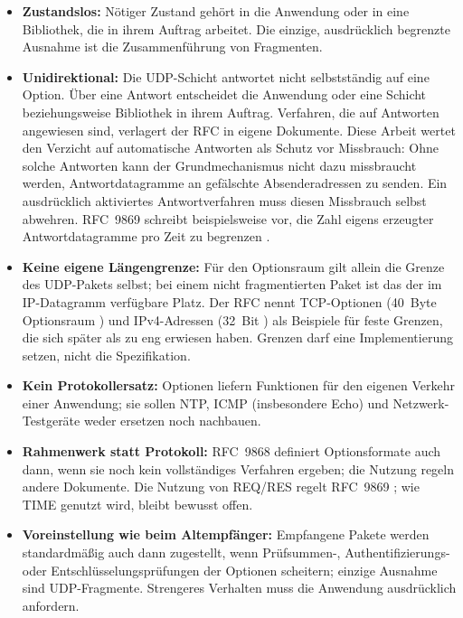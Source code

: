 \begin{itemize}
    \item \textbf{Zustandslos:} Nötiger Zustand gehört in die Anwendung oder in eine Bibliothek, die in ihrem Auftrag
    arbeitet. Die einzige, ausdrücklich begrenzte Ausnahme ist die Zusammenführung von Fragmenten.

    \item \textbf{Unidirektional:} Die UDP-Schicht antwortet nicht selbstständig auf eine Option.
    Über eine Antwort entscheidet die Anwendung oder eine Schicht beziehungsweise Bibliothek in ihrem Auftrag.
    Verfahren, die auf Antworten angewiesen sind, verlagert der RFC in eigene Dokumente. Diese Arbeit wertet den
    Verzicht auf automatische Antworten als Schutz vor Missbrauch: Ohne solche Antworten kann der Grundmechanismus nicht
    dazu missbraucht werden, Antwortdatagramme an gefälschte Absenderadressen zu senden. Ein ausdrücklich aktiviertes
    Antwortverfahren muss diesen Missbrauch selbst abwehren. RFC~9869 schreibt beispielsweise vor, die Zahl eigens
    erzeugter Antwortdatagramme pro Zeit zu begrenzen \cite[Sec.~3.1]{rfc9869}.

    \item \textbf{Keine eigene Längengrenze:} Für den Optionsraum gilt allein die Grenze des UDP-Pakets selbst; bei
    einem nicht fragmentierten Paket ist das der im IP-Datagramm verfügbare Platz. Der RFC nennt TCP-Optionen (40~Byte
    Optionsraum \cite{rfc9293}) und IPv4-Adressen (32~Bit \cite{rfc791}) als Beispiele für feste Grenzen, die sich
    später als zu eng erwiesen haben. Grenzen darf eine Implementierung setzen, nicht die Spezifikation.

    \item \textbf{Kein Protokollersatz:} Optionen liefern Funktionen für den eigenen Verkehr einer Anwendung; sie sollen
    NTP, ICMP (insbesondere Echo) und Netzwerk-Testgeräte weder ersetzen noch nachbauen.

    \item \textbf{Rahmenwerk statt Protokoll:} RFC~9868 definiert Optionsformate auch dann, wenn sie noch kein
    vollständiges Verfahren ergeben; die Nutzung regeln andere Dokumente. Die Nutzung von REQ/RES regelt RFC~9869
    \cite{rfc9869}; wie TIME genutzt wird, bleibt bewusst offen.

    \item \textbf{Voreinstellung wie beim Altempfänger:} Empfangene Pakete werden standardmäßig auch dann zugestellt,
    wenn Prüfsummen-, Authentifizierungs- oder Entschlüsselungsprüfungen der Optionen scheitern; einzige Ausnahme sind
    UDP-Fragmente. Strengeres Verhalten muss die Anwendung ausdrücklich anfordern.

\end{itemize}

